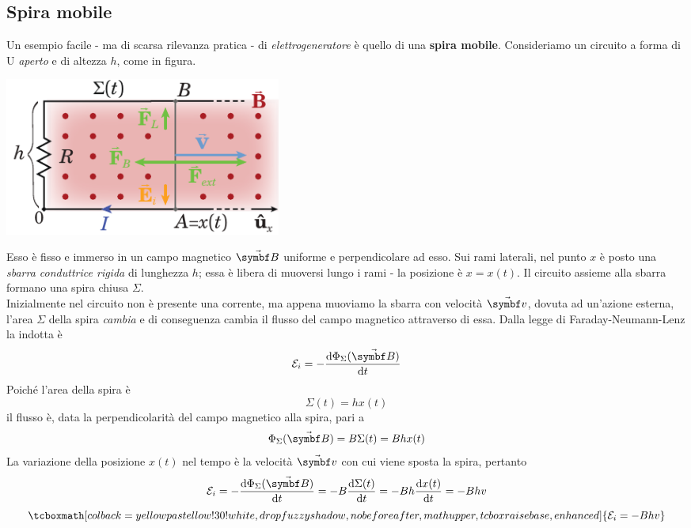 \subsection{Spira mobile}\label{spiramobilegeneratori}
Un esempio facile - ma di scarsa rilevanza pratica - di \textit{elettrogeneratore} è quello di una \textbf{spira mobile}. Consideriamo un circuito a forma di U \textit{aperto} e di altezza $h$, come in figura.
\begin{center}
	\includegraphics[width=0.4\textwidth]{images/chp11/chp11generatorespira.pdf}
\end{center}
Esso è fisso e immerso in un campo magnetico $\vba{B}$ uniforme e perpendicolare ad esso. Sui rami laterali, nel punto $x$ è posto una \textit{sbarra conduttrice rigida} di lunghezza $h$; essa è libera di muoversi lungo i rami - la posizione è $x=x(t)$. Il circuito assieme alla sbarra formano una spira chiusa $\Sigma$.\\
Inizialmente nel circuito non è presente una corrente, ma appena muoviamo la sbarra con velocità $\vba{v}$, dovuta ad un'azione esterna, l'area $\Sigma$ della spira \textit{cambia} e di conseguenza cambia il flusso del campo magnetico attraverso di essa. Dalla legge di Faraday-Neumann-Lenz la \fem indotta è
\begin{equation*}
	\mathcal{E}_i=-\dv{\Phi_{\Sigma}(\vba{B})}{t}
\end{equation*}
Poiché l'area della spira è
\begin{equation*}
	\Sigma(t)=hx(t)
\end{equation*}
il flusso è, data la perpendicolarità del campo magnetico alla spira, pari a
\begin{equation*}
	\Phi_{\Sigma}(\vba{B})=B\Sigma(t)=Bhx(t)
\end{equation*}
La variazione della posizione $x(t)$ nel tempo è la velocità $\vba{v}$ con cui viene sposta la spira, pertanto
\begin{equation*}
	\mathcal{E}_i=-\dv{\Phi_{\Sigma}(\vba{B})}{t}=-B\dv{\Sigma(t)}{t}=-Bh\dv{x(t)}{t}=-Bhv
\end{equation*}
\begin{equation}
	\tcboxmath[colback=yellowpastellow!30!white,drop fuzzy shadow, nobeforeafter, math upper, tcbox raise base, enhanced]{\mathcal{E}_i=-Bhv}
\end{equation}
